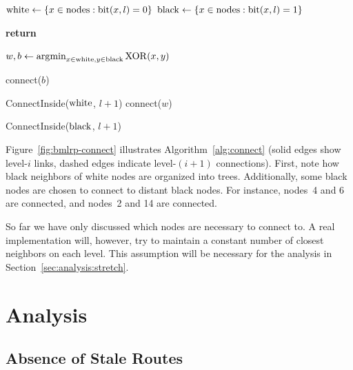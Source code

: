 \documentclass[conference]{IEEEtran}
\theoremstyle{definition}
\DeclareMathOperator*{\argmin}{\arg\!\min}
\begin{document}
\begin{algorithm}
    \begin{algorithmic}[1]
            \State ${\rm white} \gets \{x \in {\rm nodes}: {\rm bit}(x, l) = 0\}$
            \State ${\rm black} \gets \{x \in {\rm nodes}: {\rm bit}(x, l) = 1\}$
            
                \State \textbf{return}
            \EndIf

            \State $w,b \gets \argmin_{x \in {\rm white}, y \in {\rm black}}{\rm XOR}(x, y)$

                    \State connect($b$)
                \EndIf
                
                \State ConnectInside(${\rm white}$, $l + 1$)
            \Else
                    \State connect($w$)
                \EndIf

                \State ConnectInside(${\rm black}$, $l + 1$)
            \EndIf
        \EndProcedure
    \end{algorithmic}
\end{algorithm}

Figure~\ref{fig:bmlrp-connect} illustrates Algorithm~\ref{alg:connect} (solid edges show level-$i$ links, dashed edges indicate level-$(i+1)$ connections). First, note how black neighbors of white nodes are organized into trees. Additionally, some black nodes are chosen to connect to distant black nodes. For instance, nodes~4 and 6 are connected, and nodes~2 and 14 are connected.

So far we have only discussed which nodes are necessary to connect to. A real implementation will, however, try to maintain a constant number of closest neighbors on each level. This assumption will be necessary for 
the analysis in Section~\ref{sec:analysis:stretch}.


\section{Analysis}
\label{sec:analysis}

\subsection{Absence of Stale Routes}
\label{sec:analysis:staleroutes}
\end{document}
